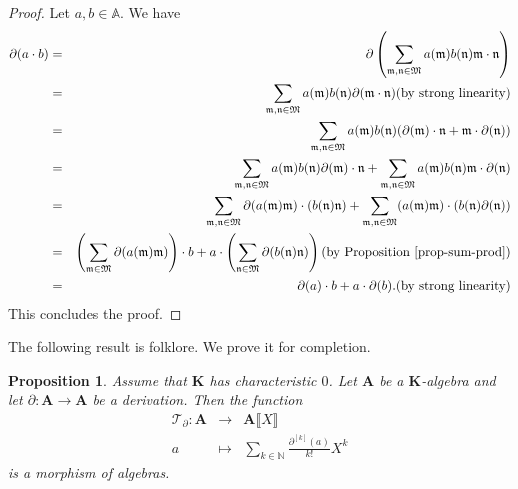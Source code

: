 \documentclass{article}
\newcommand{\of}{:}
\newtheorem{proposition}[theorem]{Proposition}
\theoremstyle{remark}\newtheorem*{convention*}{Convention}
\begin{document}
\begin{proof}
  Let $a, b \in \mathbb{A}$. We have
  \begin{eqnarray*}
    \partial (a \cdot b) & = & \partial \left( \sum_{\mathfrak{m},
    \mathfrak{n} \in \mathfrak{M}} a (\mathfrak{m}) b
    (\mathfrak{n})\mathfrak{m} \cdot \mathfrak{n} \right)\\
    & = & \sum_{\mathfrak{m}, \mathfrak{n} \in \mathfrak{M}} a (\mathfrak{m})
    b (\mathfrak{n}) \partial (\mathfrak{m} \cdot \mathfrak{n})
    \text{{\hspace*{\fill}}(by strong linearity)}\\
    & = & \sum_{\mathfrak{m}, \mathfrak{n} \in \mathfrak{M}} a (\mathfrak{m})
    b (\mathfrak{n})  (\partial (\mathfrak{m}) \cdot \mathfrak{n}+\mathfrak{m}
    \cdot \partial (\mathfrak{n}))\\
    & = & \sum_{\mathfrak{m}, \mathfrak{n} \in \mathfrak{M}} a (\mathfrak{m})
    b (\mathfrak{n}) \partial (\mathfrak{m}) \cdot \mathfrak{n}+
    \sum_{\mathfrak{m}, \mathfrak{n} \in \mathfrak{M}} a (\mathfrak{m}) b
    (\mathfrak{n}) \mathfrak{m} \cdot \partial (\mathfrak{n})\\
    & = & \sum_{\mathfrak{m}, \mathfrak{n} \in \mathfrak{M}} \partial (a
    (\mathfrak{m})\mathfrak{m}) \cdot (b (\mathfrak{n})\mathfrak{n}) +
    \sum_{\mathfrak{m}, \mathfrak{n} \in \mathfrak{M}} (a
    (\mathfrak{m})\mathfrak{m}) \cdot (b (\mathfrak{n}) \partial
    (\mathfrak{n}))\\
    & = & \left( \sum_{\mathfrak{m} \in \mathfrak{M}} \partial (a
    (\mathfrak{m})\mathfrak{m}) \right) \cdot b + a \cdot \left(
    \sum_{\mathfrak{n} \in \mathfrak{M}} \partial (b
    (\mathfrak{n})\mathfrak{n}) \right) \text{{\hspace*{\fill}}(by
    Proposition~\ref{prop-sum-prod})}\\
    & = & \partial (a) \cdot b + a \cdot \partial (b) .
    \text{{\hspace*{\fill}}(by strong linearity)}
  \end{eqnarray*}
  This concludes the proof.
\end{proof}

The following result is folklore. We prove it for completion.

\begin{proposition}
  \label{prop-Taylor-morphism}Assume that $\mathbf{K}$ has characteristic $0$.
  Let $\mathbf{A}$ be a $\mathbf{K}$-algebra and let $\partial \of \mathbf{A}
  \longrightarrow \mathbf{A}$ be a derivation. Then the function
  \begin{eqnarray}
    \mathcal{T}_{\partial} \of \mathbf{A} & \longrightarrow & \mathbf{A}
    \llbracket X \rrbracket \nonumber\\
    a & \longmapsto & \sum_{k \in \mathbb{N}} \frac{\partial^{[k]} (a)}{k!}
    X^k  \label{eq-Tpartial}
  \end{eqnarray}
  is a morphism of algebras.
\end{proposition}
\end{document}

